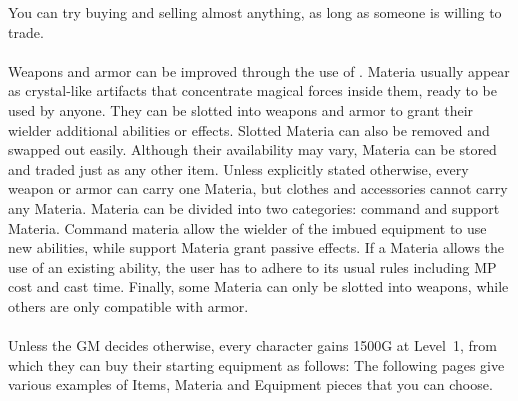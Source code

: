 You can try buying and selling almost anything, as long as someone is willing to trade.
%
\vfill
%
%
\newpage
%
\\\\
%
Weapons and armor can be improved through the use of .
Materia usually appear as crystal-like artifacts that concentrate magical forces inside them, ready to be used by anyone.
They can be slotted into weapons and armor to grant their wielder additional abilities or effects.
Slotted Materia can also be removed and swapped out easily. 
Although their availability may vary, Materia can be stored and traded just as any other item.
Unless explicitly stated otherwise, every weapon or armor can carry one Materia, but clothes and accessories cannot carry any Materia.
Materia can be divided into two categories: command and support Materia.
Command materia allow the wielder of the imbued equipment to use new abilities, while support Materia grant passive effects.
If a Materia allows the use of an existing ability, the user has to adhere to its usual rules including MP cost and cast time.
Finally, some Materia can only be slotted into weapons, while others are only compatible with armor.
%
\vfill
%
\\\\
%
Unless the GM decides otherwise, every character gains 1500G at Level~1, from which they can buy their starting equipment as follows:
\ofrow
{}
The following pages give various examples of Items, Materia and Equipment pieces that you can choose.

